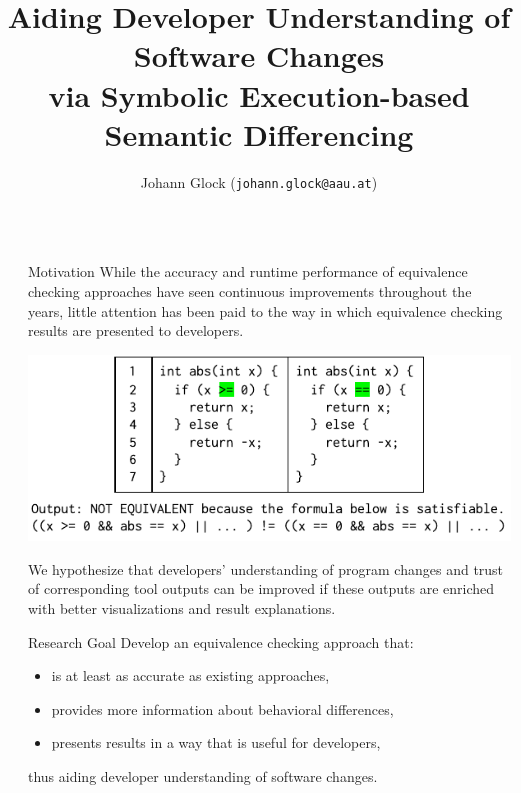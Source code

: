 \documentclass[final,hyperref={pdfpagelabels=false}]{beamer}
\title{\fontsize{64}{64}\selectfont{}Aiding Developer Understanding of Software Changes\\[18pt]via Symbolic Execution-based Semantic Differencing} %
\author{Johann Glock (\texttt{johann.glock@aau.at})}
\institute{Software Engineering Research Group, University of Klagenfurt}
\newcommand{\shrink}{-15pt}
\begin{document}

\begin{frame}[t] %

\begin{columns}[t] %

  \begin{column}{.025\textwidth}\end{column} %

  \begin{column}{.47\textwidth} %
    \vspace{\shrink}
    \begin{block}{Motivation}
      While the accuracy and runtime performance of equivalence checking approaches have seen continuous improvements throughout the years, little attention has been paid to the way in which equivalence checking results are presented to developers.

      \vspace{10pt}
      \begin{center}
        \includegraphics[width=\columnwidth]{code-example.drawio}
      \end{center}
      \vspace{-20pt}

      We hypothesize that developers' understanding of program changes and trust of corresponding tool outputs can be improved if these outputs are enriched with better visualizations and result explanations.
    \end{block}

    \begin{block}{Research Goal}
      Develop an equivalence checking approach that:
      \begin{itemize}
        \item is at least as accurate as existing approaches,
        \item provides more information about behavioral differences,
        \item presents results in a way that is useful for developers,
      \end{itemize}
      thus aiding developer understanding of software changes.
    \end{block}


\end{column}
\end{columns}
\end{frame}
\end{document}
